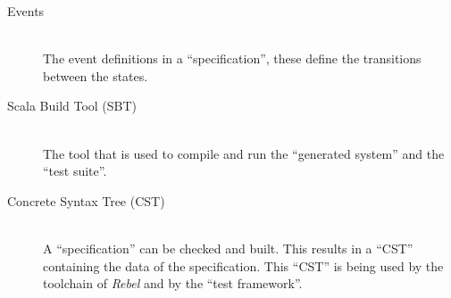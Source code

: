 \begin{description}
\item[Events]\hfill\\
The event definitions in a ``specification'', these define the transitions
between the states.

\item[Scala Build Tool (SBT)]\hfill\\
The tool that is used to compile and run the ``generated system'' and the
``test suite''.

\item[Concrete Syntax Tree (CST)]\hfill\\
A ``specification'' can be checked and built. This results in a ``CST''
containing the data of the specification. This ``CST'' is being used by the
toolchain of \textit{Rebel} and by the ``test framework''.

\end{description}
